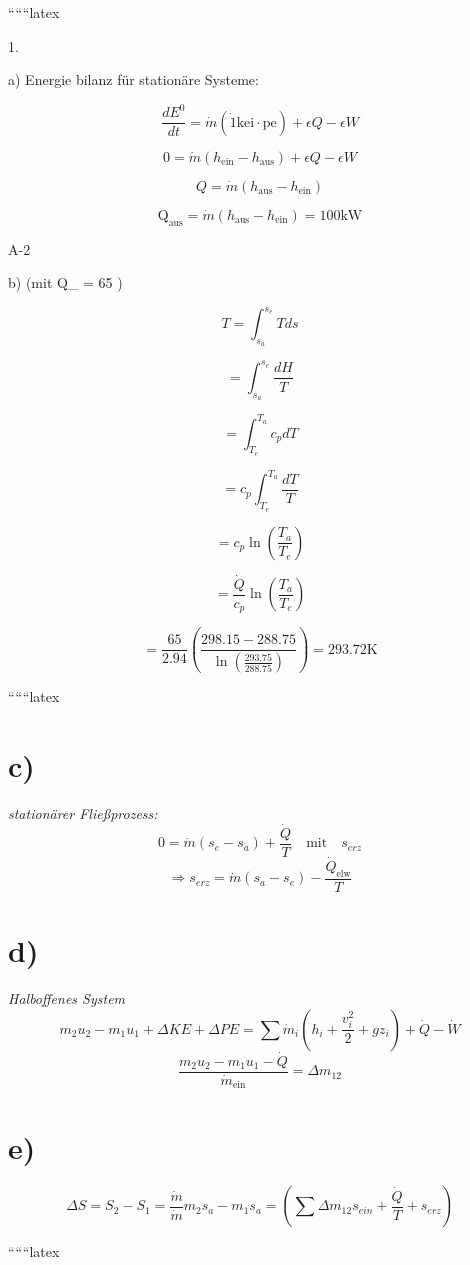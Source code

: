 
``````latex


1. 

a) Energie bilanz für stationäre Systeme:

\[
\frac{dE^0}{dt} = \dot{m} (\dot{1} \text{kei} \cdot \text{pe}) + \epsilon Q - \epsilon W
\]

\[
0 = \dot{m} (h_{\text{ein}} - h_{\text{aus}}) + \epsilon Q - \epsilon W
\]

\[
Q = \dot{m} (h_{\text{aus}} - h_{\text{ein}})
\]

\[
\text{Q}_{\text{aus}} = \dot{m} (h_{\text{aus}} - h_{\text{ein}}) = 100 \text{kW}
\]

A-2

b) (mit Q_{} = 65 )

\[
T = \int_{s_a}^{s_e} T ds
\]

\[
= \int_{s_a}^{s_e} \frac{dH}{T}
\]

\[
= \int_{T_e}^{T_a} c_p dT
\]

\[
= c_p \int_{T_e}^{T_a} \frac{dT}{T}
\]

\[
= c_p \ln \left( \frac{T_a}{T_e} \right)
\]

\[
= \frac{\dot{Q}}{c_p} \ln \left( \frac{T_a}{T_e} \right)
\]

\[
= \frac{65}{2.94} \left( \frac{298.15 - 288.75}{\ln \left( \frac{293.75}{288.75} \right)} \right) = 293.72 \text{K}
\]

``````latex

\section*{c)}
\textit{stationärer Fließprozess:}
\[
0 = \dot{m}(s_e - s_a) + \frac{\dot{Q}}{T} \quad \text{mit} \quad s_{erz}
\]
\[
\Rightarrow s_{erz} = \dot{m}(s_a - s_e) - \frac{\dot{Q}_{\text{elw}}}{T}
\]

\section*{d)}
\textit{Halboffenes System}
\[
m_2 u_2 - m_1 u_1 + \Delta KE + \Delta PE = \sum \dot{m}_i \left( h_i + \frac{v_i^2}{2} + gz_i \right) + \dot{Q} - \dot{W}
\]
\[
\frac{m_2 u_2 - m_1 u_1 - \dot{Q}}{\dot{m}_{\text{ein}}} = \Delta m_{12}
\]

\section*{e)}
\[
\Delta S = S_2 - S_1 = \frac{\dot{m}}{\dot{m}} m_2 s_a - m_1 s_a = \left( \sum \Delta m_{12} s_{ein} + \frac{\dot{Q}}{T} + s_{erz} \right)
\]

``````latex


